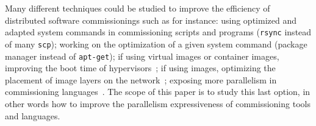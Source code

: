 Many different techniques could be studied to improve the efficiency of distributed software commissionings such as for instance: using optimized and adapted system commands in commissioning scripts and programs (\eg \texttt{rsync} instead of many \texttt{scp}); working on the optimization of a given system command (\eg \nix package manager instead of \texttt{apt-get}); if using virtual images or container images, improving the boot time of hypervisors~\cite{nguyen:hal-02172288}; if using \docker images, optimizing the placement of image layers on the network~\cite{darrous:hal-01745405}; exposing more parallelism in commissioning languages~\cite{dicosmo:hal-01233489}. The scope of this paper is to study this last option, in other words how to improve the parallelism expressiveness of commissioning tools and languages.